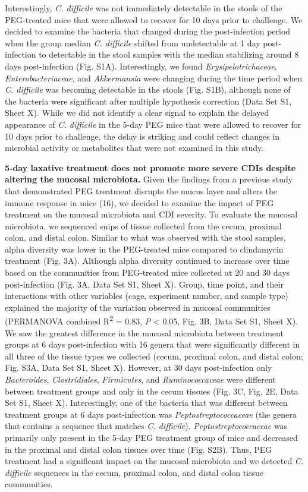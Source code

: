 \documentclass[
  11pt,
]{article}
\begin{document}
Interestingly, \emph{C. difficile} was not immediately detectable in the
stools of the PEG-treated mice that were allowed to recover for 10 days
prior to challenge. We decided to examine the bacteria that changed
during the post-infection period when the group median \emph{C.
difficile} shifted from undetectable at 1 day post-infection to
detectable in the stool samples with the median stabilizing around 8
days post-infection (Fig. S1A). Interestingly, we found
\emph{Erysipelotrichaceae}, \emph{Enterobacteriaceae}, and
\emph{Akkermansia} were changing during the time period when \emph{C.
difficile} was becoming detectable in the stools (Fig. S1B), although
none of the bacteria were significant after multiple hypothesis
correction (Data Set S1, Sheet X). While we did not identify a clear
signal to explain the delayed appearance of \emph{C. difficile} in the
5-day PEG mice that were allowed to recover for 10 days prior to
challenge, the delay is striking and could reflect changes in microbial
activity or metabolites that were not examined in this study.

\textbf{5-day laxative treatment does not promote more severe CDIs
despite altering the mucosal microbiota.} Given the findings from a
previous study that demonstrated PEG treatment disrupts the mucus layer
and alters the immune response in mice (16), we decided to examine the
impact of PEG treatment on the mucosal microbiota and CDI severity. To
evaluate the mucosal microbiota, we sequenced snips of tissue collected
from the cecum, proximal colon, and distal colon. Similar to what was
observed with the stool samples, alpha diversity was lower in the
PEG-treated mice compared to clindamycin treatment (Fig. 3A). Although
alpha diversity continued to increase over time based on the communities
from PEG-treated mice collected at 20 and 30 days post-infection (Fig.
3A, Data Set S1, Sheet X). Group, time point, and their interactions
with other variables (cage, experiment number, and sample type)
explained the majority of the variation observed in mucosal communities
(PERMANOVA combined R\textsuperscript{2} = 0.83, \emph{P} \textless{}
0.05, Fig. 3B, Data Set S1, Sheet X). We saw the greatest difference in
the mucosal microbiota between treatment groups at 6 days post-infection
with 16 genera that were significantly different in all three of the
tissue types we collected (cecum, proximal colon, and distal colon; Fig.
S3A, Data Set S1, Sheet X). However, at 30 days post-infection only
\emph{Bacteroides}, \emph{Clostridiales}, \emph{Firmicutes}, and
\emph{Ruminococcaceae} were different between treatment groups and only
in the cecum tissues (Fig. 3C, Fig. 2E, Data Set S1, Sheet X).
Interestingly, one of the bacteria that was different between treatment
groups at 6 days post-infection was \emph{Peptostreptococcaceae} (the
genera that contains a sequence that matches \emph{C. difficile}).
\emph{Peptostreptococcaceae} was primarily only present in the 5-day PEG
treatment group of mice and decreased in the proximal and distal colon
tissues over time (Fig. S2B). Thus, PEG treatment had a significant
impact on the mucosal microbiota and we detected \emph{C. difficile}
sequences in the cecum, proximal colon, and distal colon tissue
communities.
\end{document}
